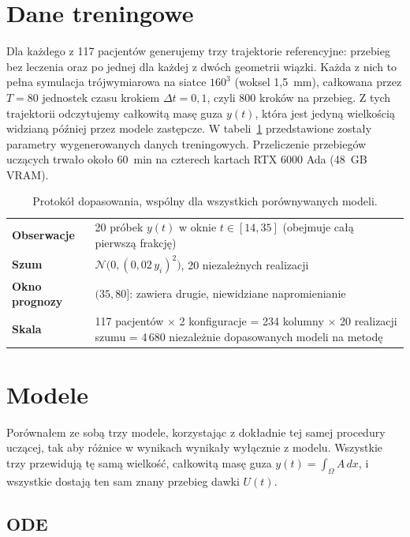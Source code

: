 \documentclass[11pt,a4paper]{article}
\begin{document}
\section{Dane treningowe}

Dla każdego z 117 pacjentów generujemy trzy trajektorie referencyjne: przebieg bez
leczenia oraz po jednej dla każdej z dwóch geometrii wiązki. Każda z nich to pełna
symulacja trójwymiarowa na siatce $160^3$ (woksel 1,5~mm), całkowana przez $T=80$
jednostek czasu krokiem $\Delta t = 0{,}1$, czyli 800 kroków na przebieg. Z tych
trajektorii odczytujemy całkowitą masę guza $y(t)$, która jest jedyną wielkością
widzianą później przez modele zastępcze. W tabeli~\ref{tab:train} przedstawione zostały parametry wygenerowanych danych treningowych. Przeliczenie przebiegów uczących trwało około 60~min na czterech kartach RTX 6000 Ada (48~GB VRAM).

\begin{table}[H]
\centering\small
\begin{tabular}{@{}p{3.1cm}p{12.2cm}@{}}
\toprule
\textbf{Obserwacje} & 20 próbek $y(t)$ w oknie $t \in [14,35]$ (obejmuje całą pierwszą frakcję)\\
\textbf{Szum} & $\mathcal{N}\big(0,(0{,}02\,y_i)^2\big)$, 20 niezależnych realizacji\\
\textbf{Okno prognozy} & $(35,80]$: zawiera drugie, niewidziane napromienianie\\
\textbf{Skala} & 117 pacjentów $\times$ 2 konfiguracje = 234 kolumny $\times$ 20 realizacji
szumu = 4\,680 niezależnie dopasowanych modeli na metodę\\
\bottomrule
\end{tabular}
\caption{Protokół dopasowania, wspólny dla wszystkich porównywanych modeli.}
\label{tab:train}
\end{table}

\section{Modele}

Porównałem ze sobą trzy modele, korzystając z dokładnie tej samej procedury uczącej, tak aby
różnice w wynikach wynikały wyłącznie z modelu. Wszystkie trzy przewidują tę
samą wielkość, całkowitą masę guza $y(t)=\int_\Omega A\,dx$, i wszystkie dostają ten
sam znany przebieg dawki $U(t)$.

\subsection{ODE}
\label{sec:model-ode}
\end{document}
